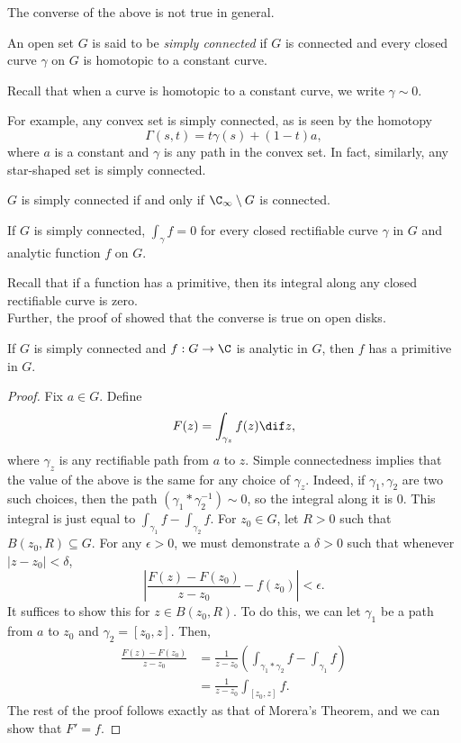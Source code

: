 		The converse of the above is not true in general.

		\begin{fdef}
			An open set $G$ is said to be \emph{simply connected} if $G$ is connected and every closed curve $\gamma$ on $G$ is homotopic to a constant curve.
		\end{fdef}

		Recall that when a curve is homotopic to a constant curve, we write $\gamma \sim 0$.

		For example, any convex set is simply connected, as is seen by the homotopy
		\[ \Gamma(s,t) = t\gamma(s) + (1-t)a, \]
		where $a$ is a constant and $\gamma$ is any path in the convex set. In fact, similarly, any star-shaped set is simply connected.

		\begin{ftheo}
			$G$ is simply connected if and only if $\C_\infty \setminus G$ is connected.
		\end{ftheo}

		\begin{corollary}
			If $G$ is simply connected, $\int_\gamma f = 0$ for every closed rectifiable curve $\gamma$ in $G$ and analytic function $f$ on $G$.
		\end{corollary}

		Recall that if a function has a primitive, then its integral along any closed rectifiable curve is zero.\\
		Further, the proof of  showed that the converse is true on open disks.

		\begin{prop}
			If $G$ is simply connected and $f:G \to \C$ is analytic in $G$, then $f$ has a primitive in $G$.
		\end{prop}
		\begin{proof}
			Fix $a \in G$. Define
			\[ F(z) = \int_{\gamma_z} f(z) \dif z, \]
			where $\gamma_z$ is any rectifiable path from $a$ to $z$. Simple connectedness implies that the value of the above is the same for any choice of $\gamma_z$. Indeed, if $\gamma_1,\gamma_2$ are two such choices, then the path $(\gamma_1 * \gamma_2^{-1}) \sim 0$, so the integral along it is $0$. This integral is just equal to $\int_{\gamma_1} f - \int_{\gamma_2} f$. For $z_0 \in G$, let $R > 0$ such that $B(z_0,R) \subseteq G$. For any $\epsilon > 0$, we must demonstrate a $\delta > 0$ such that whenever $|z-z_0| < \delta$,
			\[ \left| \frac{F(z) - F(z_0)}{z-z_0} - f(z_0) \right| < \epsilon. \]
			It suffices to show this for $z \in B(z_0,R)$. To do this, we can let $\gamma_1$ be a path from $a$ to $z_0$ and $\gamma_2 = [z_0,z]$. Then,
			\begin{align*}
				\frac{F(z) - F(z_0)}{z-z_0} &= \frac{1}{z-z_0} \left( \int_{\gamma_1 * \gamma_2} f - \int_{\gamma_1} f \right) \\
					&= \frac{1}{z-z_0} \int_{[z_0,z]} f.
			\end{align*}
			The rest of the proof follows exactly as that of Morera's Theorem, and we can show that $F' = f$.
		\end{proof}


